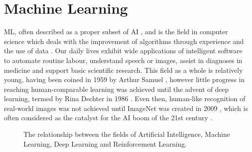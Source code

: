 \chapter{Machine Learning\label{chap:ML}}


\Gls{ML}, often described as a proper subset of \gls{AI}
\cite{Goodfellow-et-al-2016}, and is the field in computer science which deals
with the improvement of algorithms through experience and the use of data
\cite{Mitchell97}. Our daily lives exhibit wide applications of intelligent
software to automate routine labour, understand speech or images, assist in
diagnoses in medicine and support basic scientific research. This field as a
whole is relatively young, having been coined in 1959 by Arthur Samuel
\cite{5392560}, however little progress in reaching human-comparable learning
was achieved until the advent of deep learning, termed by Rina Dechter in 1986
\cite{Rina1986}. Even then, human-like recognition of real-world images was not
achieved until ImageNet was created in 2009 \cite{5206848}, which is often
considered as the catalyst for the AI boom of the 21st century
\cite{hardy_2016}.

\begin{figure}[htp!]
    \centering
    
    \caption{
        The relationship between the fields of Artificial Intelligence,
        Machine Learning, Deep Learning and Reinforcement Learning.
    }
    \label{fig:al-ml-dl}
\end{figure}


